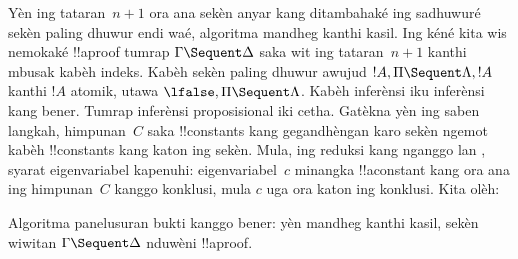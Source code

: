 \documentclass[../../../include/open-logic-section]{subfiles}
\begin{document}
Yèn ing tataran~$n+1$ ora ana sekèn anyar kang
ditambahaké ing sadhuwuré sekèn paling dhuwur
endi waé, algoritma mandheg kanthi kasil. Ing kéné
kita wis nemokaké !!a{proof} tumrap
$\Gamma \Sequent \Delta$ saka wit ing tataran~$n+1$
kanthi mbusak kabèh indeks. Kabèh sekèn paling
dhuwur awujud $!A, \Pi \Sequent \Lambda, !A$ kanthi $!A$ atomik, utawa
$\lfalse, \Pi \Sequent \Lambda$. Kabèh inferènsi
iku inferènsi  kang bener. Tumrap
inferènsi proposisional iki cetha. Gatèkna yèn ing
saben langkah, himpunan~$C$ saka !!{constant}s kang
gegandhèngan karo sekèn ngemot kabèh !!{constant}s
kang katon ing sekèn. Mula, ing reduksi kang nganggo
\LeftR{\lexists} lan \RightR{\lforall}, syarat
eigenvariabel kapenuhi: eigenvariabel~$c$ minangka
!!a{constant} kang ora ana ing himpunan~$C$ kanggo
konklusi, mula $c$ uga ora katon ing konklusi.
Kita olèh:

\begin{prop}
Algoritma panelusuran bukti kanggo  bener:
yèn mandheg kanthi kasil, sekèn wiwitan
$\Gamma \Sequent \Delta$ nduwèni !!a{proof}.
\end{prop}
\end{document}
